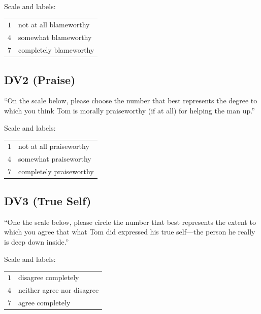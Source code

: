 \documentclass[scrarticle]{scrartcl}
\begin{document}
\vspace{0.75em}
\noindent Scale and labels:

\vspace{0.75em}
\begin{tabular}{r @{ = } l}
    $1$   & not at all blameworthy   \\
    $4$   & somewhat blameworthy     \\
    $7$   & completely blameworthy   \\
\end{tabular}


\subsection*{DV2 (Praise)}
\enquote{On the scale below, please choose the number that best represents the degree to which you think Tom is morally praiseworthy (if at all) for helping the man up.}

\vspace{0.75em}
\noindent Scale and labels:

\vspace{0.75em}
\begin{tabular}{r @{ = } l}
    $1$   & not at all praiseworthy   \\
    $4$   & somewhat praiseworthy     \\
    $7$   & completely praiseworthy   \\
\end{tabular}


\subsection*{DV3 (True Self)}
\enquote{One the scale below, please circle the number that best represents the extent to which you agree that what Tom did expressed his true self---the person he really is deep down inside.}

\vspace{0.75em}
\noindent Scale and labels:

\vspace{0.75em}
\begin{tabular}{r @{ = } l}
    $1$   & disagree completely          \\
    $4$   & neither agree nor disagree   \\
    $7$   & agree completely             \\
\end{tabular}
\end{document}
